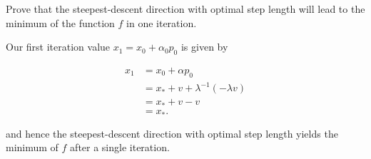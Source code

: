 Prove that the steepest-descent direction with optimal step length will lead to the minimum of the function $f$ in one
iteration.

\begin{solution}
    Our first iteration value $x_1 = x_0 + \alpha_0 p_0$ is given by

    \begin{align*}
        x_1 &= x_0 + \alpha p_0 \\
            &= x_* + v + \lambda^{-1} \left( -\lambda v \right) \\
            &= x_* + v - v \\
            &= x_*.
    \end{align*}

    and hence the steepest-descent direction with optimal step length yields the minimum of $f$ after a single 
    iteration.
    \ \\
\end{solution}